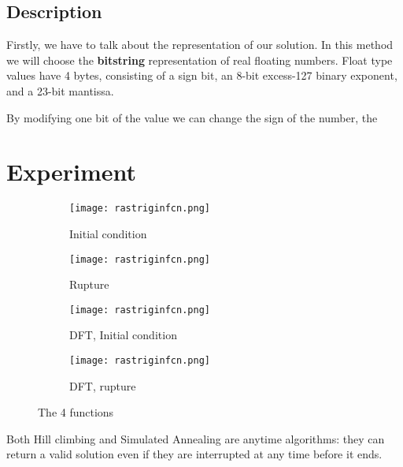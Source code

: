 \documentclass{article}
\begin{document}
\subsection{Description}
Firstly, we have to talk about the representation of our solution. In this method we will choose the \textbf{bitstring} representation of real floating numbers. Float type values have 4 bytes, consisting of a sign bit, an 8-bit excess-127 binary exponent, and a 23-bit mantissa. 

By modifying one bit of the value we can change the sign of the number, the 

\section{Experiment}

\begin{figure}[ht] 
  \begin{subfigure}[b]{0.5\linewidth}
    \centering
    \texttt{[image: rastriginfcn.png]} 
    \caption{Initial condition} 
    \label{fig7:a} 
    \vspace{4ex}
  \end{subfigure}%
  \begin{subfigure}[b]{0.5\linewidth}
    \centering
    \texttt{[image: rastriginfcn.png]} 
    \caption{Rupture} 
    \label{fig7:b} 
    \vspace{4ex}
  \end{subfigure} 
  \begin{subfigure}[b]{0.5\linewidth}
    \centering
    \texttt{[image: rastriginfcn.png]} 
    \caption{DFT, Initial condition} 
    \label{fig7:c} 
  \end{subfigure}%
  \begin{subfigure}[b]{0.5\linewidth}
    \centering
    \texttt{[image: rastriginfcn.png]} 
    \caption{DFT, rupture} 
    \label{fig7:d} 
  \end{subfigure} 
  \caption{The 4 functions}
  \label{fig7} 
\end{figure}

Both Hill climbing and Simulated Annealing are anytime algorithms: they can return a valid solution even if they are interrupted at any time before it ends. 
\end{document}
